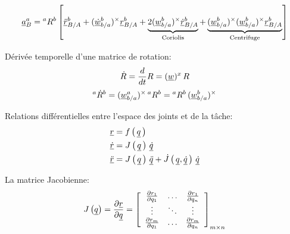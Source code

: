\begin{align}
	\underline{a}_{B}^{a}
	=
	{}^{a}R^b \left[
		\underline{\ddot{r}}^b_{B/A}
		+
		(\underline{\dot{w}}_{b/a}^b)^{\times} \underline{r}^b_{B/A}
		+
		\underbrace{
			2 (\underline{w}_{b/a}^b)^{\times} \underline{\dot{r}}^b_{B/A}
		}_{\text{Coriolis}}
		+
		\underbrace{
			(\underline{w}_{b/a}^b)^{\times} (\underline{w}_{b/a}^b)^{\times} \underline{r}^b_{B/A}
		}_{\text{Centrifuge}}
		\right]
\end{align}

Dérivée temporelle d'une matrice de rotation:
\begin{equation}
	\dot{R} = \frac{d}{dt} R = (\underline{w})^x \, R
\end{equation}
\begin{equation}
{}^{a}\dot{R}^b =  (\underline{w}_{b/a}^a)^{\times} \, {}^{a}R^b =   {}^{a}R^b \, (\underline{w}_{b/a}^b)^{\times}
\end{equation}

Relations différentielles entre l'espace des joints et de la tâche:
\begin{align}
	\underline{r} &= f\left( \, \underline{q} \, \right) \\
	\underline{\dot{r}} &= J\left( \, \underline{q} \, \right) \, \underline{\dot{q}} \\
	\underline{\ddot{r}} &= J\left( \, \underline{q} \, \right) \, \underline{\ddot{q}}  + \dot{J} \left( \, \underline{q}  , \underline{\dot{q}} \, \right) \, \underline{\dot{q}}
\end{align}

La matrice Jacobienne:
\begin{equation}
	J\left( \underline{q} \right) = \frac{\partial \underline{r}}{\partial \underline{q}} =
	\left[ \begin{array}{c c c}
			   \frac{\partial r_1 }{\partial q_1}   &  \hdots & \frac{\partial r_1 }{\partial q_n} \\
			   \vdots                               &  \ddots & \vdots                             \\
			   \frac{\partial r_m }{\partial q_1}   &  \hdots & \frac{\partial r_m }{\partial q_n}
	\end{array} \right]_{m \times n}
\end{equation}

